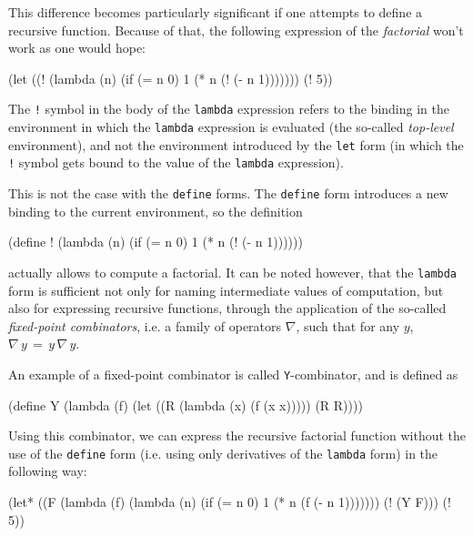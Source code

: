 This difference becomes particularly significant if one attempts
to define a recursive function. Because of that, the following
expression of the \textit{factorial} won't work as one would hope:

\begin{Snippet}
(let ((! (lambda (n)
           (if (= n 0)
             1
             (* n (! (- n 1)))))))
  (! 5))
\end{Snippet}

The \texttt{!} symbol in the body of the \texttt{lambda} expression
refers to the binding in the environment in which the \texttt{lambda}
expression is evaluated (the so-called \emph{top-level} environment),
and not the environment introduced by the \texttt{let} form (in which
the \texttt{!} symbol gets bound to the value of the \texttt{lambda}
expression).

This is not the case with the \texttt{define} forms. The \texttt{define}
form introduces a new binding to the current environment, so the
definition

\begin{Snippet}
(define ! (lambda (n)
            (if (= n 0)
              1
              (* n (! (- n 1))))))
\end{Snippet}

actually allows to compute a factorial. It can be noted
however\cite{Harrison1997}, that the \texttt{lambda} form is sufficient
not only for naming intermediate values of computation, but also for
expressing recursive functions, through the application of the so-called
\textit{fixed-point combinators}, i.e. a family of operators $\nabla$, such
that for any $y$, $\nabla\,y\,=\,y\,\nabla\,y$.

An example of a fixed-point combinator is called \texttt{Y}-combinator, and is
defined as
\begin{Snippet}
(define Y (lambda (f)
            (let ((R (lambda (x) (f (x x)))))
              (R R))))
\end{Snippet}

Using this combinator, we can express the recursive factorial function
without the use of the \texttt{define} form (i.e. using only derivatives
of the \texttt{lambda} form) in the following way:

\begin{Snippet}
(let* ((F (lambda (f)
            (lambda (n)
              (if (= n 0)
                1
                (* n (f (- n 1)))))))
       (! (Y F)))
  (! 5))
\end{Snippet}

